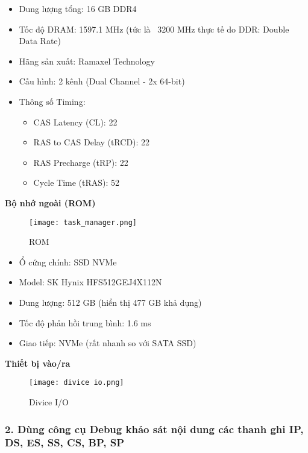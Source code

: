 \begin{itemize}
    \item Dung lượng tổng: 16 GB DDR4
    \item Tốc độ DRAM: 1597.1 MHz (tức là ~3200 MHz thực tế do DDR: Double Data Rate)
    \item Hãng sản xuất: Ramaxel Technology
    \item Cấu hình: 2 kênh (Dual Channel - 2x 64-bit)
    \item Thông số Timing:
        \begin{itemize}
        \item CAS Latency (CL): 22
        \item RAS to CAS Delay (tRCD): 22
        \item RAS Precharge (tRP): 22
        \item Cycle Time (tRAS): 52
        \end{itemize}
\end{itemize}
\textbf{Bộ nhớ ngoài (ROM)}
\begin{figure}[H]
    \centering
    \texttt{[image: task\_manager.png]}
    \caption{ROM}   
    \label{fig:computer_rom}
\end{figure}

\begin{itemize}
    \item Ổ cứng chính: SSD NVMe
    \item Model: SK Hynix HFS512GEJ4X112N
    \item Dung lượng: 512 GB (hiển thị 477 GB khả dụng)
    \item Tốc độ phản hồi trung bình: 1.6 ms
    \item Giao tiếp: NVMe (rất nhanh so với SATA SSD)
\end{itemize}


\textbf{Thiết bị vào/ra}
\begin{figure}[H]
    \centering
    \texttt{[image: divice io.png]}
    \caption{Divice I/O}
    \label{fig:computer_divice}
\end{figure}


\subsubsection*{2. Dùng công cụ Debug khảo sát nội dung các thanh ghi IP, DS, ES, SS, CS, BP, SP}


